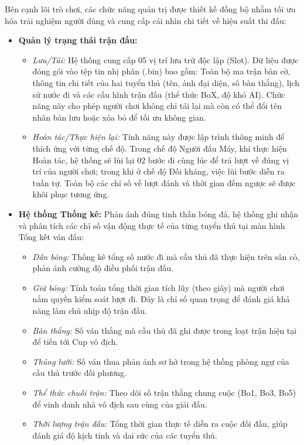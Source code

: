\noindent \indent Bên cạnh lõi trò chơi, các chức năng quản trị được thiết kế đồng bộ nhằm tối ưu hóa trải nghiệm người dùng và cung cấp cái nhìn chi tiết về hiệu suất thi đấu:

\begin{itemize}
    \item \textbf{Quản lý trạng thái trận đấu:}
    \begin{itemize}
        \item \textit{Lưu/Tải:} Hệ thống cung cấp 05 vị trí lưu trữ độc lập (Slot). Dữ liệu được đóng gói vào tệp tin nhị phân (.bin) bao gồm: Toàn bộ ma trận bàn cờ, thông tin chi tiết của hai tuyển thủ (tên, ảnh đại diện, số bàn thắng), lịch sử nước đi và các cấu hình trận đấu (thể thức BoX, độ khó AI). Chức năng này cho phép người chơi không chỉ tải lại mà còn có thể đổi tên nhãn bản lưu hoặc xóa bỏ để tối ưu không gian.
        \item \textit{Hoàn tác/Thực hiện lại:} Tính năng này được lập trình thông minh để thích ứng với từng chế độ. Trong chế độ Người đấu Máy, khi thực hiện Hoàn tác, hệ thống sẽ lùi lại 02 bước đi cùng lúc để trả lượt về đúng vị trí của người chơi; trong khi ở chế độ Đối kháng, việc lùi bước diễn ra tuần tự. Toàn bộ các chỉ số về lượt đánh và thời gian đếm ngược sẽ được khôi phục tương ứng.
    \end{itemize}
    
    \item \textbf{Hệ thống Thống kê:} Phản ánh đúng tinh thần bóng đá, hệ thống ghi nhận và phân tích các chỉ số vận động thực tế của từng tuyển thủ tại màn hình Tổng kết ván đấu:
    \begin{itemize}
        \item \textit{Dẫn bóng:} Thống kê tổng số nước đi mà cầu thủ đã thực hiện trên sân cỏ, phản ánh cường độ điều phối trận đấu.
        \item \textit{Giữ bóng:} Tính toán tổng thời gian tích lũy (theo giây) mà người chơi nắm quyền kiểm soát lượt đi. Đây là chỉ số quan trọng để đánh giá khả năng làm chủ nhịp độ trận đấu.
        \item \textit{Bàn thắng:} Số ván thắng mà cầu thủ đã ghi được trong loạt trận hiện tại để tiến tới Cup vô địch.
        \item \textit{Thủng lưới:} Số ván thua phản ánh sơ hở trong hệ thống phòng ngự của cầu thủ trước đối phương.
        \item \textit{Thể thức chuỗi trận:} Theo dõi số trận thắng chung cuộc (Bo1, Bo3, Bo5) để vinh danh nhà vô địch sau cùng của giải đấu.
        \item \textit{Thời lượng trận đấu:} Tổng thời gian thực tế diễn ra cuộc đối đầu, giúp đánh giá độ kịch tính và dai sức của các tuyển thủ.
    \end{itemize}
\end{itemize}


